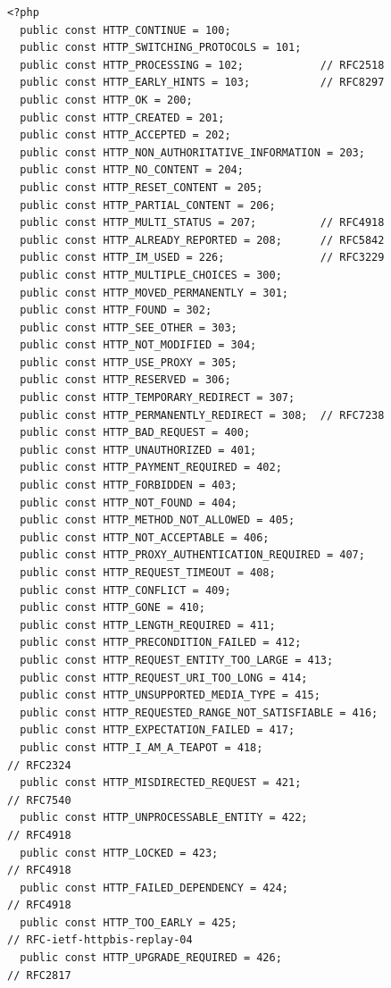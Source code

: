 \documentclass{article}
\begin{document}
\begin{verbatim}
<?php
  public const HTTP_CONTINUE = 100;
  public const HTTP_SWITCHING_PROTOCOLS = 101;
  public const HTTP_PROCESSING = 102;            // RFC2518
  public const HTTP_EARLY_HINTS = 103;           // RFC8297
  public const HTTP_OK = 200;
  public const HTTP_CREATED = 201;
  public const HTTP_ACCEPTED = 202;
  public const HTTP_NON_AUTHORITATIVE_INFORMATION = 203;
  public const HTTP_NO_CONTENT = 204;
  public const HTTP_RESET_CONTENT = 205;
  public const HTTP_PARTIAL_CONTENT = 206;
  public const HTTP_MULTI_STATUS = 207;          // RFC4918
  public const HTTP_ALREADY_REPORTED = 208;      // RFC5842
  public const HTTP_IM_USED = 226;               // RFC3229
  public const HTTP_MULTIPLE_CHOICES = 300;
  public const HTTP_MOVED_PERMANENTLY = 301;
  public const HTTP_FOUND = 302;
  public const HTTP_SEE_OTHER = 303;
  public const HTTP_NOT_MODIFIED = 304;
  public const HTTP_USE_PROXY = 305;
  public const HTTP_RESERVED = 306;
  public const HTTP_TEMPORARY_REDIRECT = 307;
  public const HTTP_PERMANENTLY_REDIRECT = 308;  // RFC7238
  public const HTTP_BAD_REQUEST = 400;
  public const HTTP_UNAUTHORIZED = 401;
  public const HTTP_PAYMENT_REQUIRED = 402;
  public const HTTP_FORBIDDEN = 403;
  public const HTTP_NOT_FOUND = 404;
  public const HTTP_METHOD_NOT_ALLOWED = 405;
  public const HTTP_NOT_ACCEPTABLE = 406;
  public const HTTP_PROXY_AUTHENTICATION_REQUIRED = 407;
  public const HTTP_REQUEST_TIMEOUT = 408;
  public const HTTP_CONFLICT = 409;
  public const HTTP_GONE = 410;
  public const HTTP_LENGTH_REQUIRED = 411;
  public const HTTP_PRECONDITION_FAILED = 412;
  public const HTTP_REQUEST_ENTITY_TOO_LARGE = 413;
  public const HTTP_REQUEST_URI_TOO_LONG = 414;
  public const HTTP_UNSUPPORTED_MEDIA_TYPE = 415;
  public const HTTP_REQUESTED_RANGE_NOT_SATISFIABLE = 416;
  public const HTTP_EXPECTATION_FAILED = 417;
  public const HTTP_I_AM_A_TEAPOT = 418;                                               // RFC2324
  public const HTTP_MISDIRECTED_REQUEST = 421;                                         // RFC7540
  public const HTTP_UNPROCESSABLE_ENTITY = 422;                                        // RFC4918
  public const HTTP_LOCKED = 423;                                                      // RFC4918
  public const HTTP_FAILED_DEPENDENCY = 424;                                           // RFC4918
  public const HTTP_TOO_EARLY = 425;                                                   // RFC-ietf-httpbis-replay-04
  public const HTTP_UPGRADE_REQUIRED = 426;                                            // RFC2817

\end{verbatim}
\end{document}
